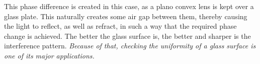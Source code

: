 \documentclass[11pt]{article}
\begin{document}
	This phase difference is created in this case, as a plano convex lens is kept over a glass plate. This naturally creates some air gap between them, thereby causing the light to reflect, as well as refract, in such a way that the required phase change is achieved. The better the glass surface is, the better and sharper is the interference pattern. \textit{Because of that, checking the uniformity of a glass surface is one of its major applications. }
\end{document}
